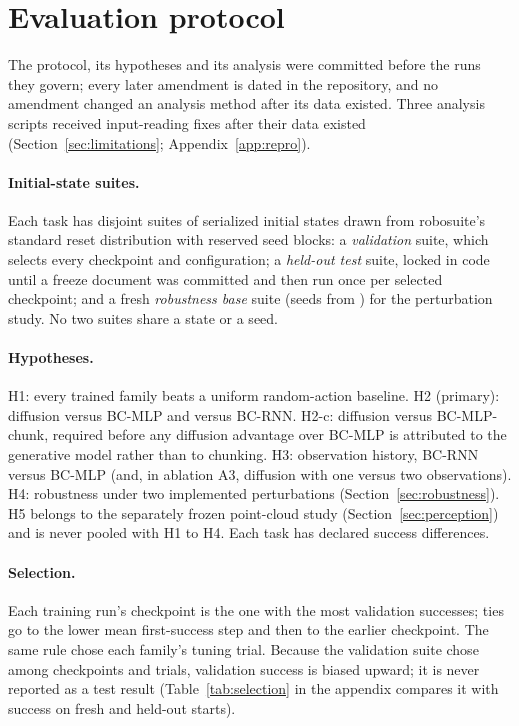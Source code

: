 \section{Evaluation protocol}
\label{sec:protocol}

The protocol, its hypotheses and its analysis were committed before the runs they govern;
every later amendment is dated in the repository, and no amendment changed an analysis
method after its data existed. Three analysis scripts received input-reading fixes after their
data existed (Section~\ref{sec:limitations}; Appendix~\ref{app:repro}).

\paragraph{Initial-state suites.} Each task has disjoint suites of
 serialized initial states drawn from robosuite's standard reset
distribution with reserved seed blocks: a \emph{validation} suite, which selects every
checkpoint and configuration; a \emph{held-out test} suite, locked in code until a freeze
document was committed and then run once per selected checkpoint; and a fresh
\emph{robustness base} suite (seeds from ) for the perturbation study. No
two suites share a state or a seed.

\paragraph{Hypotheses.} H1: every trained family beats a uniform random-action baseline.
H2 (primary): diffusion versus BC-MLP and versus BC-RNN. H2-c: diffusion versus
BC-MLP-chunk, required before any diffusion advantage over BC-MLP is attributed to the
generative model rather than to chunking. H3: observation history, BC-RNN versus BC-MLP (and,
in ablation A3, diffusion with one versus two observations). H4: robustness under two
implemented perturbations (Section~\ref{sec:robustness}). H5 belongs to the separately frozen
point-cloud study (Section~\ref{sec:perception}) and is never pooled with H1 to H4. Each task
has  declared success differences.

\paragraph{Selection.} Each training run's checkpoint is the one with the most validation
successes; ties go to the lower mean first-success step and then to the earlier checkpoint.
The same rule chose each family's tuning trial. Because the validation suite chose among
 checkpoints and  trials, validation success is biased upward;
it is never reported as a test result (Table~\ref{tab:selection} in the appendix compares it
with success on fresh and held-out starts).

